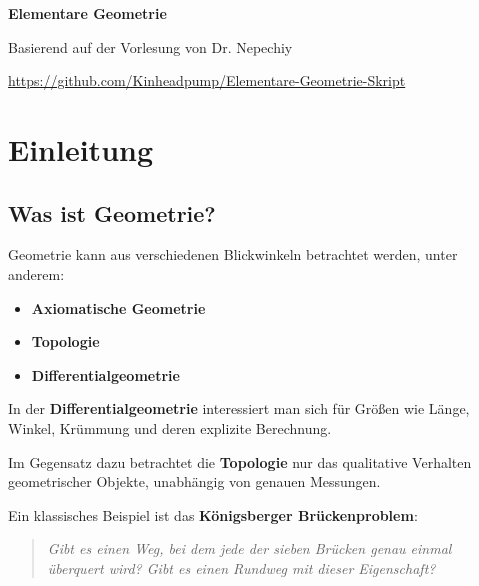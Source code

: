 \documentclass[a4paper,12pt]{article}
\theoremstyle{break}
\begin{document}
\begin{titlepage}
    \centering
    \vspace*{2cm}
    
    {\Huge\bfseries Elementare Geometrie \par}
    \vspace{1.5cm}
    
    {\Large Basierend auf der Vorlesung von Dr. Nepechiy \par}
    \vspace{2cm}
    
    \vfill
    \begin{flushleft}
      \footnotesize \url{https://github.com/Kinheadpump/Elementare-Geometrie-Skript}
    \end{flushleft}
\end{titlepage}

\newpage
\tableofcontents
\newpage

\section{Einleitung}

\subsection{Was ist Geometrie?}
Geometrie kann aus verschiedenen Blickwinkeln betrachtet werden, unter anderem:

\begin{itemize}
    \item \textbf{Axiomatische Geometrie}
    \item \textbf{Topologie}
    \item \textbf{Differentialgeometrie}
\end{itemize}

In der \textbf{Differentialgeometrie} interessiert man sich für Größen wie Länge, Winkel, Krümmung und deren explizite Berechnung. 

Im Gegensatz dazu betrachtet die \textbf{Topologie} nur das qualitative Verhalten geometrischer Objekte, unabhängig von genauen \glqq Messungen\grqq{}.

Ein klassisches Beispiel ist das \textbf{Königsberger Brückenproblem}:

\begin{quote}
    \textit{Gibt es einen Weg, bei dem jede der sieben Brücken genau einmal überquert wird? Gibt es einen Rundweg mit dieser Eigenschaft?}
\end{quote}
\end{document}
